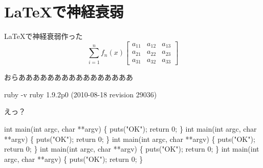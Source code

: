 \chapter{\LaTeX で神経衰弱}
\label{chap:techbookfest_localstudents_2017}
\LaTeX で神経衰弱作った
\begin{equation*}
\sum_{i=1}^nf_n(x)
\begin{bmatrix}
    a_{11} & a_{12} & a_{13} \\
    a_{21} & a_{22} & a_{23} \\
    a_{31} & a_{32} & a_{33}
\end{bmatrix}
\end{equation*}

おらああああああああああああああああ

\begin{reviewcmd}
\textdollar{} ruby {-}v
ruby 1.9.2p0 (2010{-}08{-}18 revision 29036)
\end{reviewcmd}

\begin{center}
\Huge えっ？
\end{center}

\begin{reviewlist}
int main(int argc, char **argv)
\{
  puts("OK");
  return 0;
\}
int main(int argc, char **argv)
\{
  puts("OK");
  return 0;
\}
int main(int argc, char **argv)
\{
  puts("OK");
  return 0;
\}
int main(int argc, char **argv)
\{
  puts("OK");
  return 0;
\}
int main(int argc, char **argv)
\{
  puts("OK");
  return 0;
\}
\end{reviewlist}
